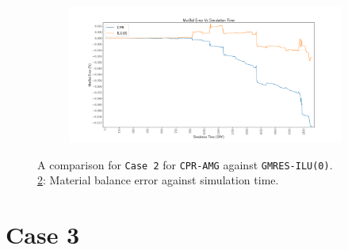 \begin{figure}
\centering
\begin{subfigure}[b]{\textwidth}
   \includegraphics[width=1\linewidth]{figures/case2/matbalerr_time.pdf}
   \caption{}
   \label{case2_matbalerr}
\end{subfigure}

\caption[caption]{A comparison for \texttt{Case 2} for \texttt{CPR-AMG} against \texttt{GMRES-ILU(0)}.\\\hspace{\textwidth}
	\cref{case2_matbalerr}: Material balance error against simulation time. \\\hspace{\textwidth}}
\end{figure}

\clearpage

\section{Case 3}

